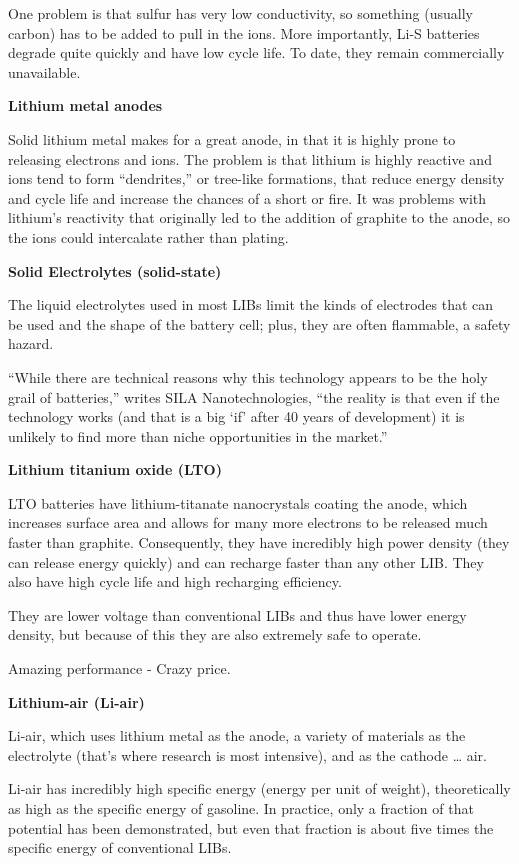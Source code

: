 \documentclass[
]{book}
\begin{document}
One problem is that sulfur has very low conductivity, so something (usually carbon) has to be added to pull in the ions. More importantly, Li-S batteries degrade quite quickly and have low cycle life. To date, they remain commercially unavailable.

\textbf{Lithium metal anodes}

Solid lithium metal makes for a great anode, in that it is highly prone to releasing electrons and ions.
The problem is that lithium is highly reactive and ions tend to form ``dendrites,'' or tree-like formations, that reduce energy density and cycle life and increase the chances of a short or fire. It was problems with lithium's reactivity that originally led to the addition of graphite to the anode, so the ions could intercalate rather than plating.

\textbf{Solid Electrolytes (solid-state)}

The liquid electrolytes used in most LIBs limit the kinds of electrodes that can be used and the shape of the battery cell; plus, they are often flammable, a safety hazard.

``While there are technical reasons why this technology appears to be the holy grail of batteries,'' writes SILA Nanotechnologies, ``the reality is that even if the technology works (and that is a big `if' after 40 years of development) it is unlikely to find more than niche opportunities in the market.''

\textbf{Lithium titanium oxide (LTO) }

LTO batteries have lithium-titanate nanocrystals coating the anode, which increases surface area and allows for many more electrons to be released much faster than graphite. Consequently, they have incredibly high power density (they can release energy quickly) and can recharge faster than any other LIB. They also have high cycle life and high recharging efficiency.

They are lower voltage than conventional LIBs and thus have lower energy density, but because of this they are also extremely safe to operate.

Amazing performance - Crazy price.

\textbf{Lithium-air (Li-air)}

Li-air, which uses lithium metal as the anode, a variety of materials as the electrolyte (that's where research is most intensive), and as the cathode \ldots{} air.

Li-air has incredibly high specific energy (energy per unit of weight), theoretically as high as the specific energy of gasoline. In practice, only a fraction of that potential has been demonstrated, but even that fraction is about five times the specific energy of conventional LIBs.
\end{document}
